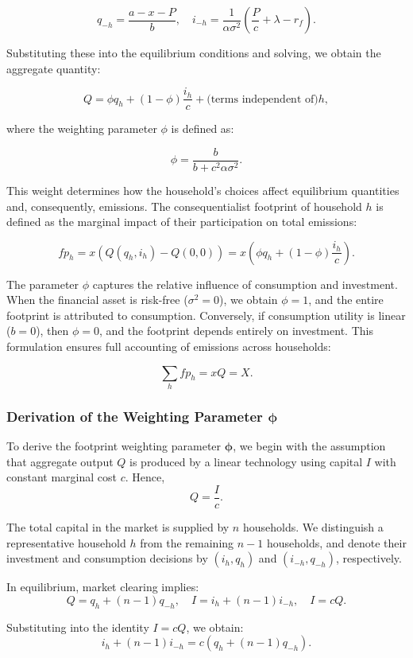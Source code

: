 \documentclass[12pt,a4paper]{article}%
\begin{document}
\[
q_{-h} = \frac{a - x - P}{b}, \quad i_{-h} = \frac{1}{\alpha \sigma^2} \left( \frac{P}{c} + \lambda - r_f \right).
\]

Substituting these into the equilibrium conditions and solving, we obtain the aggregate quantity:

\[
Q = \phi q_h + (1 - \phi) \frac{i_h}{c} + \text{(terms independent of)} h,
\]

where the weighting parameter $\phi$ is defined as:

\[
\phi = \frac{b}{b + c^2 \alpha \sigma^2}.
\]

This weight determines how the household’s choices affect equilibrium quantities and, consequently, emissions. The consequentialist footprint of household $h$ is defined as the marginal impact of their participation on total emissions:

\[
fp_h = x \left( Q(q_h, i_h) - Q(0, 0) \right) = x \left( \phi q_h + (1 - \phi) \frac{i_h}{c} \right).
\]


The parameter $\phi$ captures the relative influence of consumption and investment. When the financial asset is risk-free ($\sigma^2 = 0$), we obtain $\phi = 1$, and the entire footprint is attributed to consumption. Conversely, if consumption utility is linear ($b = 0$), then $\phi = 0$, and the footprint depends entirely on investment. This formulation ensures full accounting of emissions across households:

\[
\sum_h fp_h = xQ = X.
\]
\subsubsection{Derivation of the Weighting Parameter \( \boldsymbol{\phi} \)}

To derive the footprint weighting parameter \( \boldsymbol{\phi} \), we begin with the assumption that aggregate output \( Q \) is produced by a linear technology using capital \( I \) with constant marginal cost \( c \). Hence,
\[
Q = \frac{I}{c}.
\]

The total capital in the market is supplied by \( n \) households. We distinguish a representative household \( h \) from the remaining \( n - 1 \) households, and denote their investment and consumption decisions by \( (i_h, q_h) \) and \( (i_{-h}, q_{-h}) \), respectively.

In equilibrium, market clearing implies:
\[
Q = q_h + (n - 1) q_{-h}, \quad I = i_h + (n - 1) i_{-h}, \quad I = cQ.
\]

Substituting into the identity \( I = cQ \), we obtain:
\[
i_h + (n - 1) i_{-h} = c \left( q_h + (n - 1) q_{-h} \right).
\]
\end{document}
